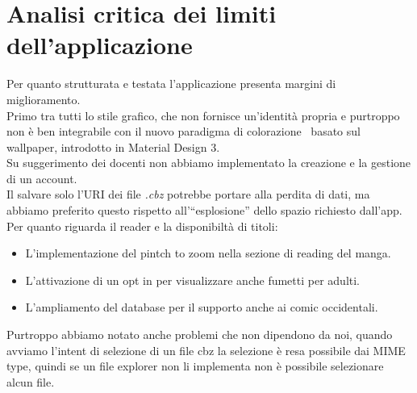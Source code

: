 \documentclass[../Assignment-3-LPSMT.tex]{subfiles}
\begin{document}
\chapter{Analisi critica dei limiti dell’applicazione}

Per quanto strutturata e testata l'applicazione presenta margini di miglioramento.\\
Primo tra tutti lo stile grafico, che non fornisce un'identità propria e purtroppo non è ben integrabile con il nuovo paradigma di colorazione~\cite{matDesColor} basato sul wallpaper, introdotto in Material Design 3.\\
Su suggerimento dei docenti non abbiamo implementato la creazione e la gestione di un account.\\
Il salvare solo l'URI dei file \emph{.cbz} potrebbe portare alla perdita di dati, ma abbiamo preferito questo rispetto all'``esplosione'' dello spazio richiesto dall'app.\\
Per quanto riguarda il reader e la disponibiltà di titoli:
\begin{itemize}
  \item L'implementazione del pintch to zoom nella sezione di reading del manga.
  \item L'attivazione di un opt in per visualizzare anche fumetti per adulti.
  \item L'ampliamento del database per il supporto anche ai comic occidentali.
\end{itemize}
Purtroppo abbiamo notato anche problemi che non dipendono da noi, quando avviamo l'intent di selezione di un file cbz la selezione è resa possibile dai MIME type, quindi se un file explorer non li implementa non è possibile selezionare alcun file.
\end{document}
